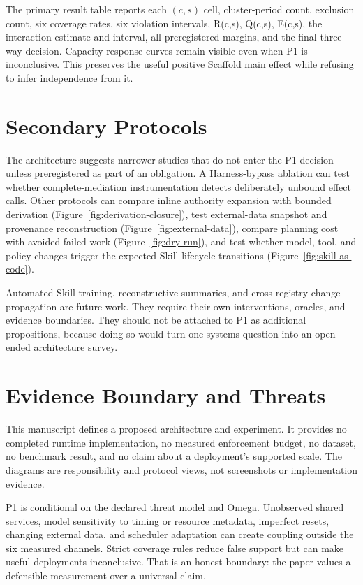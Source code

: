 The primary result table reports each $(c,s)$ cell, cluster-period count, exclusion count, six coverage rates, six violation intervals, R(c,s), Q(c,s), E(c,s), the interaction estimate and interval, all preregistered margins, and the final three-way decision. Capacity-response curves remain visible even when P1 is inconclusive. This preserves the useful positive Scaffold main effect while refusing to infer independence from it.

\section{Secondary Protocols}
\label{sec:secondary}

The architecture suggests narrower studies that do not enter the P1 decision unless preregistered as part of an obligation. A Harness-bypass ablation can test whether complete-mediation instrumentation detects deliberately unbound effect calls. Other protocols can compare inline authority expansion with bounded derivation (Figure~\ref{fig:derivation-closure}), test external-data snapshot and provenance reconstruction (Figure~\ref{fig:external-data}), compare planning cost with avoided failed work (Figure~\ref{fig:dry-run}), and test whether model, tool, and policy changes trigger the expected Skill lifecycle transitions (Figure~\ref{fig:skill-as-code}).

Automated Skill training, reconstructive summaries, and cross-registry change propagation are future work. They require their own interventions, oracles, and evidence boundaries. They should not be attached to P1 as additional propositions, because doing so would turn one systems question into an open-ended architecture survey.

\section{Evidence Boundary and Threats}
\label{sec:limitations}

This manuscript defines a proposed architecture and experiment. It provides no completed runtime implementation, no measured enforcement budget, no dataset, no benchmark result, and no claim about a deployment's supported scale. The diagrams are responsibility and protocol views, not screenshots or implementation evidence.

P1 is conditional on the declared threat model and Omega. Unobserved shared services, model sensitivity to timing or resource metadata, imperfect resets, changing external data, and scheduler adaptation can create coupling outside the six measured channels. Strict coverage rules reduce false support but can make useful deployments inconclusive. That is an honest boundary: the paper values a defensible measurement over a universal claim.

